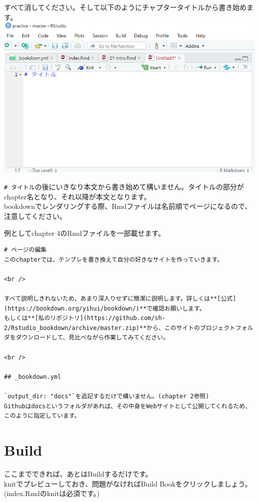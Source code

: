 \documentclass[
]{book}
\begin{document}
すべて消してください。そして以下のようにチャプタータイトルから書き始めます。
\includegraphics{pics/Rmd.png}

\texttt{\#\ タイトル}の後にいきなり本文から書き始めて構いません。タイトルの部分がchapter名となり、それ以降が本文となります。\\
bookdownでレンダリングする際、Rmdファイルは名前順でページになるので、注意してください。

例としてchapter 4のRmdファイルを一部載せます。

\begin{verbatim}
# ページの編集
このchapterでは、テンプレを書き換えて自分の好きなサイトを作っていきます。

<br />

すべて説明しきれないため、あまり深入りせずに簡潔に説明します。詳しくは**[公式](https://bookdown.org/yihui/bookdown/)**で確認お願いします。  
もしくは**[私のリポジトリ](https://github.com/sh-2/Rstudio_bookdown/archive/master.zip)**から、このサイトのプロジェクトフォルダをダウンロードして、見比べながら作業してみてください。

<br />

## _bookdown.yml

`output_dir: "docs"`を追記するだけで構いません。(chapter 2参照)  
Githubはdocsというフォルダがあれば、その中身をWebサイトとして公開してくれるため、このように指定しています。  
\end{verbatim}

\hypertarget{build}{%
\section{Build}\label{build}}

ここまでできれば、あとはBuildするだけです。\\
knitでプレビューしておき、問題がなければBuild Bookをクリックしましょう。(index.Rmdのknitは必須です。)
\end{document}
